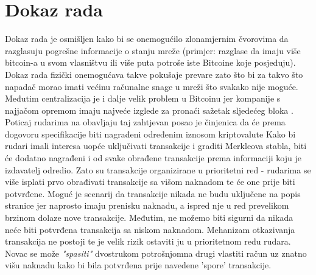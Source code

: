 \documentclass[utf8, zavrsni]{fer}
\begin{document}
\section{Dokaz rada}
Dokaz rada je osmišljen kako bi se onemogućilo zlonamjernim čvorovima da razglasuju pogrešne informacije o stanju mreže (primjer: razglase da imaju više bitcoin-a u svom vlasništvu ili više puta potroše iste Bitcoine koje posjeduju). Dokaz rada fizički onemogućava takve pokušaje prevare zato što bi za takvo što napadač morao imati većinu računalne snage u mreži što svakako nije moguće. Međutim centralizacija je i dalje velik problem u Bitcoinu jer kompanije s najjačom opremom imaju najveće izglede za pronaći sažetak sljedećeg bloka \cite{9160462}. Poticaj rudarima na obavljaju taj zahtjevan posao je činjenica da će prema dogovoru specifikacije biti nagrađeni određenim iznosom kriptovalute\footnotemark
{}
Kako bi rudari imali interesa uopće uključivati transakcije i graditi Merkleova stabla, biti će dodatno nagrađeni i od svake obrađene transakcije prema informaciji koju je izdavatelj odredio. Zato su transakcije organizirane u prioritetni red - rudarima se više isplati prvo obrađivati transakcije sa višom naknadom te će one prije biti potvrđene. Moguć je scenarij da transakcije nikada ne budu uključene na popis stranice jer naprosto imaju prenisku naknadu, a ispred nje u red prevelikom brzinom dolaze nove transakcije. Međutim, ne možemo biti sigurni da nikada neće biti potvrđena transakcija sa niskom naknadom. Mehanizam otkazivanja transakcija ne postoji te je velik rizik ostaviti ju u prioritetnom redu rudara. Novac se može \textit{"spasiti"} dvostrukom potrošnjom\footnotemark na drugi vlastiti račun uz znatno višu naknadu kako bi bila potvrđena prije navedene 'spore' transakcije.
\end{document}
